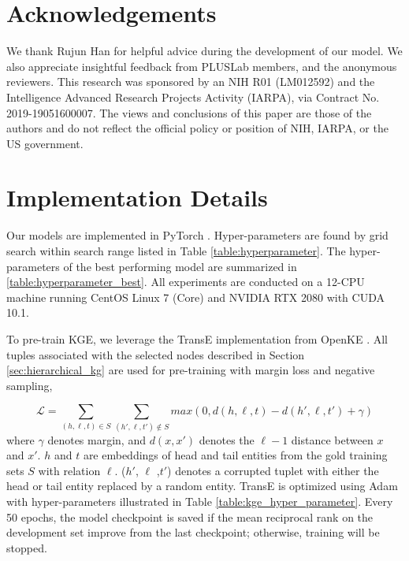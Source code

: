\documentclass[11pt,a4paper]{article}
\begin{document}
\section*{Acknowledgements}
We thank Rujun Han for helpful advice during the development of our model. We also appreciate insightful feedback from PLUSLab members, and the anonymous reviewers. This research was sponsored by an NIH R01 (LM012592) and the Intelligence Advanced Research Projects Activity (IARPA), via Contract No. 2019-19051600007. The views and conclusions of this paper are those of the authors and do not reflect the official policy or position of NIH, IARPA, or the US government. 



\clearpage
\appendix
\appendix

\section{Implementation Details}



Our models are implemented in PyTorch \cite{paszke2019pytorch}. Hyper-parameters are found by grid search within search range listed in Table \ref{table:hyperparameter}. The hyper-parameters of the best performing model are summarized in \ref{table:hyperparameter_best}. All experiments are conducted on a 12-CPU machine running CentOS Linux 7 (Core) and NVIDIA RTX 2080 with CUDA 10.1. 

To pre-train KGE, we leverage the TransE implementation from OpenKE \cite{han2018openke}. All tuples associated with the selected nodes described in Section \ref{sec:hierarchical_kg} are used for pre-training with margin loss and negative sampling,

{
\small
\begin{equation*}
  \mathcal{L} = \sum_{(h,\ell,t) \in S}\sum_{(h',\ell,t') \notin S}max(0, d(h,\ell,t)- d(h',\ell,t')+\gamma) 
\end{equation*}
}
where $\gamma$ denotes margin, and $d(x,x')$ denotes the $\ell-1$ distance between $x$ and $x'$. $h$ and $t$ are embeddings of head and tail entities from the gold training sets $S$ with relation $\ell$.  ($h'$,  $\ell$ ,$t'$) denotes a corrupted tuplet with either the head or tail entity replaced by a random entity. TransE is optimized using Adam \cite{kingma:adam} with hyper-parameters illustrated in Table \ref{table:kge_hyper_parameter}. Every 50 epochs, the model checkpoint is saved if the mean reciprocal rank on the development set improve from the last checkpoint; otherwise, training will be stopped.
\end{document}

